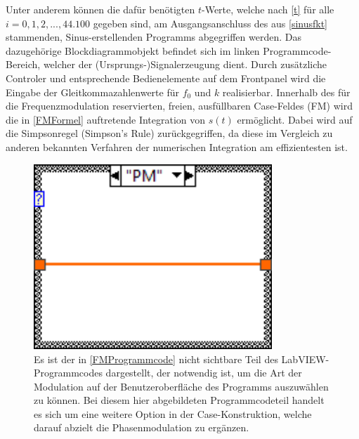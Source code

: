 \documentclass[
a4paper,
12pt,
pagesize,
ngerman
]{scrartcl}
\begin{document}
	\noindent Unter anderem können die dafür benötigten $t$-Werte, welche nach \cref{t} für alle $i = 0,1,2,...,44.100$ gegeben sind, am Ausgangsanschluss des aus \cref{sinusfkt} stammenden, Sinus-erstellenden Programms abgegriffen werden. 
	Das dazugehörige Blockdiagrammobjekt befindet sich im linken Programmcode-Bereich, welcher der (Ursprungs-)Signalerzeugung dient. 
	Durch zusätzliche Controler und entsprechende Bedienelemente auf dem Frontpanel wird die Eingabe der Gleitkommazahlenwerte für $f_0$ und $k$ realisierbar. 
	Innerhalb des für die Frequenzmodulation reservierten, freien, ausfüllbaren Case-Feldes (\glqq FM\grqq) wird die in \cref{FMFormel} auftretende Integration von $s(t)$ ermöglicht. %
	Dabei wird auf die Simpsonregel (\glqq Simpson's Rule\grqq ) zurückgegriffen, da diese im Vergleich zu anderen bekannten Verfahren der numerischen Integration am effizientesten ist. %
	
	\begin{figure}[H] %
		\centering
		\includegraphics[width=0.8\textwidth]{EIRE2018Dateien/Tag4/FMPM-Erzeugung/PM-FMPM-Erzeugungd1} %
		\caption{Es ist der in \cref{FMProgrammcode} nicht sichtbare Teil des LabVIEW-Programmcodes dargestellt, der notwendig ist, um die Art der Modulation auf der Benutzeroberfläche des Programms auszuwählen zu können. Bei diesem hier abgebildeten Programmcodeteil handelt es sich um eine weitere Option in der Case-Konstruktion, welche darauf abzielt die Phasenmodulation zu ergänzen.}
		\label{PMProgrammcode}
	\end{figure}
	
\end{document}
